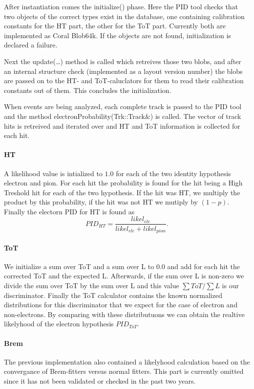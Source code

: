 \documentclass[a4paper,11pt]{article}
\begin{document}
After instantiation comes the initialize() phase. Here the PID tool
checks that two objects of the correct types exist in the database,
one containing calibration constants for the HT part, the other for
the ToT part. Currently both are implemented as Coral Blob64k. If the
objects are not found, initialization is declared a failure.

Next the update(\ldots) method is called which retreives those two
blobs, and after an internal structure check (implemented as a layout
version number) the blobs are passed on to the HT- and ToT-caluclators
for them to read their calibration constants out of them. This
concludes the initialization.

When events are being analyzed, each complete track is passed to the
PID tool and the method electronProbability(Trk::Track\&) is
called. The vector of track hits is retreived and iterated over and HT
and ToT information is collected for each hit.

\paragraph{HT} A likelihood value is intialized to $1.0$ for each of
the two identity hypothesis electron and pion. For each hit the
probability is found for the hit being a High Treshold hit for each of
the two hypothesis. If the hit was HT, we multiply the product by this
probability, if the hit was not HT we mutiply by $(1-p)$.
Finally the electorn PID for HT is found as
\begin{equation}
PID_{HT}=\frac{likel_{ele}}{likel_{ele}+likel_{pion}} .
\end{equation}

\paragraph{ToT} We initialize a sum over ToT and a sum over L to $0.0$
and add for each hit the corrected ToT and the expected L. Afterwards,
if the sum over L is non-zero we divide the sum over ToT by the sum
over L and this value $\sum ToT/\sum L$ is our discriminator.  Finally
the ToT calculator contains the known normalized distributions for
this discriminator that we expect for the case of electron and
non-electrons. By comparing with these distributuons we can obtain the
realtive likelyhood of the electron hypothesis $PID_{ToT}$.

\paragraph{Brem} The previous implementation also contained a
likelyhood calculation based on the convergance of Brem-fitters versus
normal fitters. This part is currently omitted since it has not been
validated or checked in the past two years.
\end{document}
